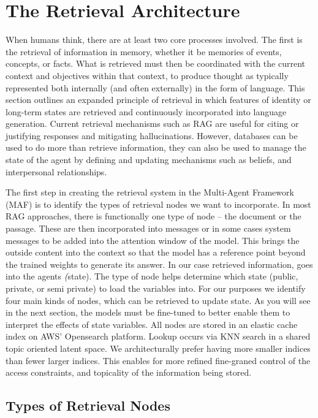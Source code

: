 \section{The Retrieval Architecture}
When humans think, there are at least two core processes involved. The first is the retrieval of information in memory, whether it be memories of events, concepts, or facts. What is retrieved must then be coordinated with the current context and objectives within that context, to produce thought as typically represented both internally (and often externally) in the form of language. This section outlines an expanded principle of retrieval in which features of identity or long-term states are retrieved and continuously incorporated into language generation. Current retrieval mechanisms such as RAG are useful for citing or justifying responses and mitigating hallucinations. However, databases can be used to do more than retrieve information, they can also be used to manage the state of the agent by defining and updating mechanisms such as beliefs, and interpersonal relationships.

The first step in creating the retrieval system in the Multi-Agent Framework (MAF) is to identify the types of retrieval nodes we want to incorporate. In most RAG
approaches, there is functionally one type of node -- the document or the passage. These are then incorporated into messages or in some cases system messages to be added into the attention window of the model. This brings the outside content into the context so that the model has a reference point beyond the trained weights to generate its answer. In our case retrieved information, goes into the agents \textit(state). The type of node helps determine which state (public, private, or semi private) to load the variables into. For our purposes we identify four main kinds of nodes, which can be retrieved to update state. As you will see in the next section, the models must be fine-tuned to better enable them to interpret the effects of state variables. All nodes are stored in an elastic cache index on AWS' Opensearch platform. Lookup occurs via KNN search in a shared topic oriented latent space. We architecturally prefer having more smaller indices than fewer larger indices. This enables for more refined fine-graned control of the access constraints, and topicality of the information being stored.

\subsection{Types of Retrieval Nodes}
